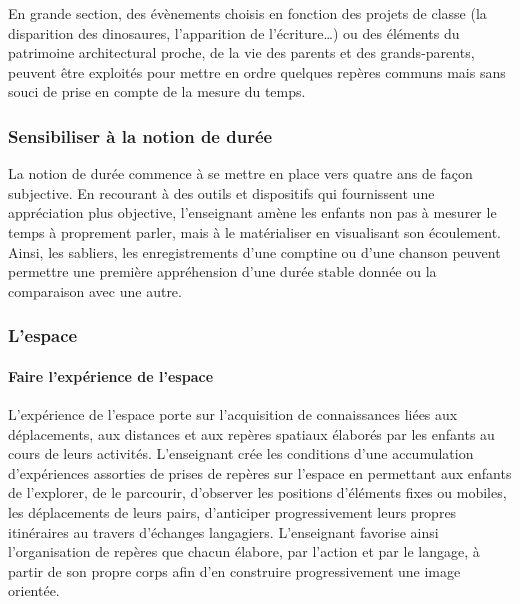 En grande section, des évènements choisis en fonction des projets de classe (la disparition des dinosaures, l’apparition de l’écriture\dots) ou des éléments du patrimoine architectural proche, de la vie des parents et des grands-parents, peuvent être exploités pour mettre en ordre quelques repères communs mais sans souci de prise en compte de la mesure du temps. 

\subsubsection{Sensibiliser à la notion de durée}
La notion de durée commence à se mettre en place vers quatre ans de façon subjective. En recourant à des outils et dispositifs qui fournissent une appréciation plus objective, l’enseignant amène les enfants non pas à mesurer le temps à proprement parler, mais à le matérialiser en visualisant son écoulement. Ainsi, les sabliers, les enregistrements d’une comptine ou d’une chanson peuvent permettre une première appréhension d’une durée stable donnée ou la comparaison avec une autre.

\subsubsection{L’espace}
\paragraph{Faire l’expérience de l’espace}
L’expérience de l’espace porte sur l’acquisition de connaissances liées aux déplacements, aux distances et aux repères spatiaux élaborés par les enfants au cours de leurs activités. L’enseignant crée les conditions d’une accumulation d'expériences assorties de prises de repères sur l’espace en permettant aux enfants de l'explorer, de le parcourir, d’observer les positions d’éléments fixes ou mobiles, les déplacements de leurs pairs, d’anticiper progressivement leurs propres itinéraires au travers d’échanges langagiers. L’enseignant favorise ainsi l’organisation de repères que chacun élabore, par l’action et par le langage, à partir de son propre corps afin d’en construire progressivement une image orientée. 

